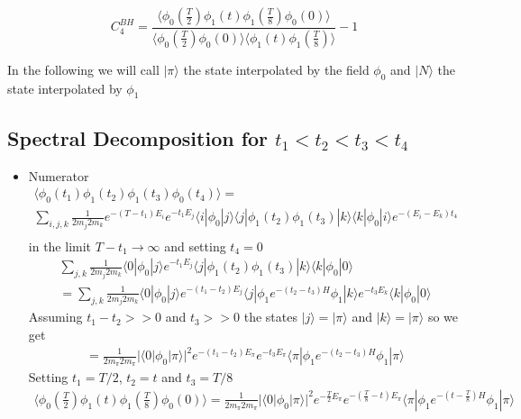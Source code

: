 \documentclass[10pt,a4paper]{article}
\begin{document}
\begin{equation}
C_4^{BH}=\frac{\langle \phi_0(\frac{T}{2})\phi_1(t)\phi_1(\frac{T}{8}) \phi_0(0)\rangle}
{\langle \phi_0(\frac{T}{2}) \phi_0(0)\rangle \langle \phi_1(t)\phi_1(\frac{T}{8}) \rangle} -1
\label{CBH_correlator}
\end{equation}

In the following we will call $|\pi\rangle$ the state interpolated by the field $\phi_0$ and $|N\rangle$ the state interpolated by $\phi_1$

\subsection{Spectral Decomposition for $t_1<t_2<t_3<t_4$}



\begin{itemize}

\item Numerator
\begin{gather}
\langle \phi_0(t_1)\phi_1(t_2)\phi_1(t_3) \phi_0(t_4)\rangle=\\
 \sum_{i,j,k}\frac{1}{ 2 m_j 2 m_k}e^{-(T-t_1)E_i} e^{-t_1E_j}\langle i| \phi_0 | j\rangle\langle j|  \phi_1(t_2)\phi_1(t_3) 
 | k\rangle\langle k|  \phi_0 |i\rangle e^{-(E_i-E_k)t_4}\\
\end{gather}
in the limit $T-t_1\to \infty$ and setting $t_4=0$
\begin{gather}
 \sum_{j,k}\frac{1}{ 2 m_j 2 m_k}\langle 0| \phi_0 | j\rangle  e^{-t_1E_j} \langle j|   \phi_1(t_2)\phi_1(t_3) 
 | k\rangle  \langle k| \phi_0 | 0\rangle  \\
 = \sum_{j,k}\frac{1}{ 2 m_j 2 m_k}\langle 0| \phi_0 | j\rangle  e^{-(t_1-t_2)E_j} \langle j|   \phi_1 e^{-(t_2-t_3)H}\phi_1 
 | k\rangle  e^{- t_3 E_k} \langle k| \phi_0 | 0\rangle
\end{gather}
Assuming $t_1-t_2>>0$ and $t_3>>0$ the states $|j\rangle =| \pi\rangle$ and 
$|k\rangle =| \pi\rangle$ so we get
\begin{gather}
=\frac{1}{ 2 m_\pi 2 m_\pi}|\langle 0| \phi_0 | \pi\rangle|^2  e^{-(t_1-t_2)E_{\pi}}e^{- t_3 E_\pi}  \langle \pi|   \phi_1 e^{-(t_2-t_3)H}\phi_1 
 | \pi\rangle  
\end{gather}
Setting  $t_1=T/2$, $t_2=t$ and $t_3=T/8$
\begin{gather}
\langle \phi_0(\frac{T}{2})\phi_1(t)\phi_1(\frac{T}{8}) \phi_0(0)\rangle=
\frac{1}{ 2 m_\pi 2 m_\pi}|\langle 0| \phi_0 | \pi\rangle|^2  e^{-\frac{T}{2}E_{\pi}}e^{- (\frac{T}{8}-t) E_\pi}  \langle \pi|   \phi_1 e^{-(t-\frac{T}{8})H}\phi_1 
 | \pi\rangle  
\end{gather}


\end{itemize}
\end{document}
